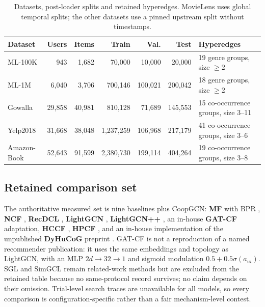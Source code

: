 \documentclass[a4paper,fleqn,longmktitle]{cas-dc}
\begin{document}
\begin{table}[t]
\centering
\caption{Datasets, post-loader splits and retained hyperedges. MovieLens uses
global temporal splits; the other datasets use a pinned upstream split without
timestamps.}
\label{tab:datasets}
\footnotesize
\begin{tabular}{lrrrrrl}
\toprule
\textbf{Dataset} & \textbf{Users} & \textbf{Items} & \textbf{Train} &
\textbf{Val.} & \textbf{Test} & \textbf{Hyperedges}\\
\midrule
ML-100K & 943 & 1{,}682 & 70{,}000 & 10{,}000 & 20{,}000 &
19 genre groups, size $\ge2$\\
ML-1M & 6{,}040 & 3{,}706 & 700{,}146 & 100{,}021 & 200{,}042 &
18 genre groups, size $\ge2$\\
Gowalla & 29{,}858 & 40{,}981 & 810{,}128 & 71{,}689 & 145{,}553 &
15 co-occurrence groups, size 3--11\\
Yelp2018 & 31{,}668 & 38{,}048 & 1{,}237{,}259 & 106{,}968 & 217{,}179 &
41 co-occurrence groups, size 3--6\\
Amazon-Book & 52{,}643 & 91{,}599 & 2{,}380{,}730 & 199{,}114 & 404{,}264 &
19 co-occurrence groups, size 3--8\\
\bottomrule
\end{tabular}
\end{table}

\subsection{Retained comparison set}
\label{sec:baselines}

The authoritative measured set is nine baselines plus CoopGCN:
\textbf{MF} with BPR \citep{rendle2009bpr}, \textbf{NCF}
\citep{he2017ncf}, \textbf{RecDCL} \citep{zhang2024recdcl},
\textbf{LightGCN} \citep{he2020lightgcn}, \textbf{LightGCN++}
\citep{lee2024lightgcnpp}, an in-house \textbf{GAT-CF} adaptation,
\textbf{HCCF} \citep{xia2022hccf}, \textbf{HPCF}
\citep{chen2024hpcf}, and an in-house implementation of the unpublished
\textbf{DyHuCoG} preprint \citep{louhichi2026dyhucog}. GAT-CF is not a reproduction of a named
recommender publication: it uses the same embeddings and topology as
LightGCN, with an MLP $2d\rightarrow32\rightarrow1$ and sigmoid modulation
$0.5+0.5\sigma(a_{ui})$. SGL and SimGCL remain related-work methods but are
excluded from the retained table because no same-protocol record survives; no
claim depends on their omission. Trial-level search traces are unavailable for
all models, so every comparison is configuration-specific rather than a fair
mechanism-level contest.
\end{document}

